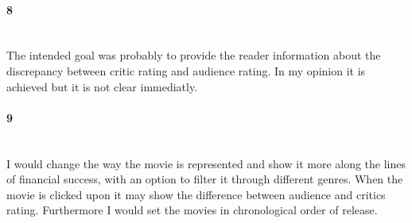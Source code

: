 \paragraph{8}\mbox{}\\
The intended goal was probably to provide the reader information about the discrepancy between critic rating and audience rating. In my opinion it is achieved but it is not clear immediatly.

\paragraph{9}\mbox{}\\
I would change the way the movie is represented and show it more along the lines of financial success, with an option to filter it through different genres. When the movie is clicked upon it may show the difference between audience and critics rating. Furthermore I would set the movies in chronological order of release.

